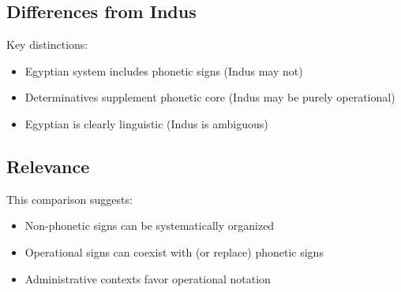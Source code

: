 \subsection{Differences from Indus}

Key distinctions:
\begin{itemize}
    \item Egyptian system includes phonetic signs (Indus may not)
    \item Determinatives supplement phonetic core (Indus may be purely operational)
    \item Egyptian is clearly linguistic (Indus is ambiguous)
\end{itemize}

\subsection{Relevance}

This comparison suggests:
\begin{itemize}
    \item Non-phonetic signs can be systematically organized
    \item Operational signs can coexist with (or replace) phonetic signs
    \item Administrative contexts favor operational notation
\end{itemize}
